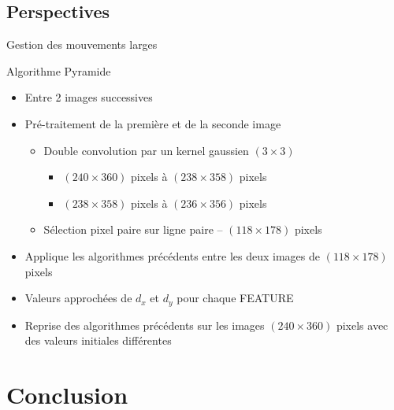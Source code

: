 \documentclass{bredelebeamer}
\begin{document}
\subsection{Perspectives}


\begin{frame}{Gestion des mouvements larges}

\begin{block}{Algorithme Pyramide}
\begin{itemize}
\item Entre 2 images successives
\item Pré-traitement de la première et de la seconde image
	\begin{itemize}
		\item Double convolution par un kernel gaussien $(3\times 3)$
			\begin{itemize}
				\item $(240\times 360)$ pixels à $(238\times 358)$ pixels
				\item $(238\times 358)$ pixels à $(236\times 356)$ pixels
			\end{itemize}
		\item Sélection pixel paire sur ligne paire -- $(118\times 178)$ pixels
	\end{itemize}
\item Applique les algorithmes précédents entre les deux images de $(118\times 178)$ pixels
\item Valeurs approchées de $d_{x}$ et $d_{y}$ pour chaque FEATURE
\item Reprise des algorithmes précédents sur les images $(240\times 360)$ pixels avec des valeurs initiales différentes
\end{itemize}
\end{block}

\end{frame}




\section{Conclusion}

\end{document}

